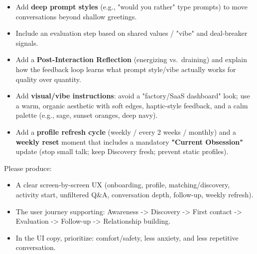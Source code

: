 \documentclass[10pt,a4paper]{article}
\begin{document}
\begin{itemize}
\item Add \textbf{deep prompt styles} (e.g., "would you rather" type prompts) to move conversations beyond shallow greetings.
\item Include an evaluation step based on shared values / "vibe" and deal-breaker signals.
\item Add a \textbf{Post-Interaction Reflection} (energizing vs.\ draining) and explain how the feedback loop learns what prompt style/vibe actually works for quality over quantity.
\item Add \textbf{visual/vibe instructions}: avoid a "factory/SaaS dashboard" look; use a warm, organic aesthetic with soft edges, haptic-style feedback, and a calm palette (e.g., sage, sunset oranges, deep navy).
\item Add a \textbf{profile refresh cycle} (weekly / every 2 weeks / monthly) and a \textbf{weekly reset} moment that includes a mandatory \textbf{"Current Obsession"} update (stop small talk; keep Discovery fresh; prevent static profiles).
\end{itemize}

Please produce:
\begin{itemize}
\item A clear screen-by-screen UX (onboarding, profile, matching/discovery, activity start, unfiltered Q\&A, conversation depth, follow-up, weekly refresh).
\item The user journey supporting: Awareness -> Discovery -> First contact -> Evaluation -> Follow-up -> Relationship building.
\item In the UI copy, prioritize: comfort/safety, less anxiety, and less repetitive conversation.
\end{itemize}
\end{document}
